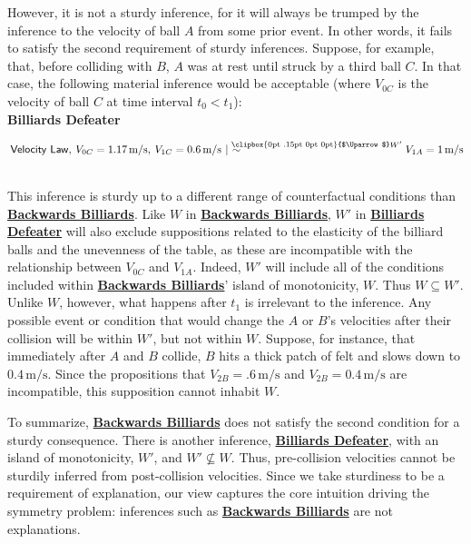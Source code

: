 \documentclass{article}                     %
\makeatletter
\newcommand{\Uuparrow}{%
	\raisebox{.2ex}{\clipbox{0pt .15pt 0pt 0pt}{$\Uparrow$}}
}
\newcommand{\nms}{%
	\mathbin{\mathpalette\@nms\expandafter}
}
\newcommand{\@nms}{\mid\joinrel\mkern-.5mu\sim}
\newcommand{\mrc}[1]{\mathbin{
		\mathchoice
		{\normalsize\hspace{.5mm}\nms^{\mkern-19mu\scriptsize\Uuparrow#1}\hspace{-.5mm}}
		{\normalsize\hspace{.5mm}\nms^{\mkern-19mu\scriptsize\Uuparrow#1}\hspace{-.5mm}}
		{\footnotesize\hspace{.5mm}\nms^{\mkern-13.5mu\fontsize{5.5}{0}\Uuparrow#1}}
		{\scriptsize\nms^{\mkern-10mu\tiny\Uuparrow#1}}
	}
}
\makeatother
\begin{document}
However, it is not a sturdy inference, for it will always be trumped by the inference to the velocity of ball $A$ from some prior event. In other words, it fails to satisfy the second requirement of sturdy inferences. Suppose, for example, that, before colliding with $B$, $A$ was at rest until struck by a third ball $C$.  In that case, the following material inference would be acceptable (where $V_{0C}$ is the velocity of ball $C$ at time interval $t_{0} < t_{1}$):\\

\noindent \label{eq:MRC_defeater}\textbf{Billiards Defeater}\hspace{6mm}\begin{minipage}[t]{.8\textwidth}
	$\hspace{.5ex} \mathsf{Velocity\ Law},\hspace{.5ex} V_{0C} = 1.17 \,\text{m/s},\hspace{.5ex} V_{1C} = 0.6\,\text{m/s} \mrc{W'}\, V_{1A} = 1\,\text{m/s}$
\end{minipage}\\ 


\noindent This inference is sturdy up to a different range of counterfactual conditions than \hyperref[eq:MRC_ballsbackwards]{\textbf{Backwards Billiards}}. Like $W$ in \hyperref[eq:MRC_ballsbackwards]{\textbf{Backwards Billiards}}, $W'$ in \hyperref[eq:MRC_defeater]{\textbf{Billiards Defeater}} will also exclude suppositions related to the elasticity of the billiard balls and the unevenness of the table, as these are incompatible with the relationship between $V_{0C}$ and $V_{1A}$. Indeed, $W'$ will include all of the conditions included within  \hyperref[eq:MRC_ballsbackwards]{\textbf{Backwards Billiards}}' island of monotonicity, $W$. Thus $W \subseteq W'$.  Unlike $W$, however, what happens after $t_{1}$ is irrelevant to the inference.  Any possible event or condition that would change the $A$ or $B$'s velocities after their collision will be within $W'$, but not within $W$. Suppose, for instance, that immediately after $A$ and $B$ collide, $B$ hits a thick patch of felt and slows down to $0.4\,\text{m/s}$. Since the propositions that $V_{2B} = .6\,\text{m/s}$ and $V_{2B} = 0.4\,\text{m/s}$ are incompatible, this supposition cannot inhabit $W$.

To summarize, \hyperref[eq:MRC_ballsbackwards]{\textbf{Backwards Billiards}} does not satisfy the second condition for a sturdy consequence.  There is another inference, \hyperref[eq:MRC_defeater]{\textbf{Billiards Defeater}}, with an island of monotonicity, $W'$, and $W'\not\subseteq W$.  Thus, pre-collision velocities cannot be sturdily inferred from post-collision velocities. Since we take sturdiness to be a requirement of explanation, our view captures the core intuition driving the symmetry problem: inferences such as \hyperref[eq:MRC_ballsbackwards]{\textbf{Backwards Billiards}} are not explanations. 
\end{document}
